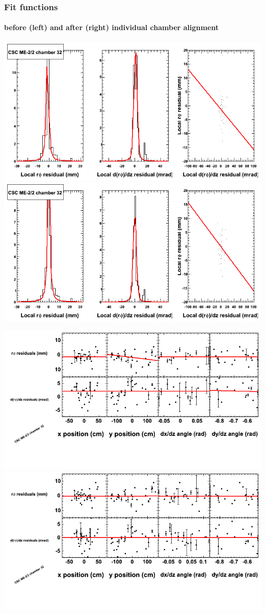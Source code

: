 \documentclass[compress]{beamer}
\begin{document}
\begin{frame}
\frametitle{Fit functions}
\framesubtitle{before (left) and after (right) individual chamber alignment}
\includegraphics[width=0.5\linewidth]{ringfits_3dof/beforefit_MEm22_32_bellcurve.png} \includegraphics[width=0.5\linewidth]{ringfits_3dof/afterfit_MEm22_32_bellcurve.png}

\includegraphics[width=0.5\linewidth]{ringfits_3dof/beforefit_MEm22_32_polynomials.png} \includegraphics[width=0.5\linewidth]{ringfits_3dof/afterfit_MEm22_32_polynomials.png}
\end{frame}
\end{document}
